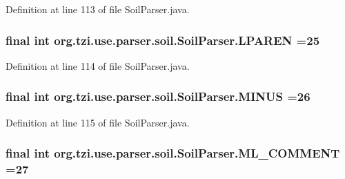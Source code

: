 Definition at line 113 of file Soil\-Parser.\-java.

\hypertarget{classorg_1_1tzi_1_1use_1_1parser_1_1soil_1_1_soil_parser_a947851c6c4b95fc941046367f0815c06}{
\subsubsection[{L\-P\-A\-R\-E\-N}]{\setlength{\rightskip}{0pt plus 5cm}final int org.\-tzi.\-use.\-parser.\-soil.\-Soil\-Parser.\-L\-P\-A\-R\-E\-N =25\hspace{0.3cm}{\ttfamily [static]}}}\label{classorg_1_1tzi_1_1use_1_1parser_1_1soil_1_1_soil_parser_a947851c6c4b95fc941046367f0815c06}


Definition at line 114 of file Soil\-Parser.\-java.

\hypertarget{classorg_1_1tzi_1_1use_1_1parser_1_1soil_1_1_soil_parser_a0a811be4aa395bd1800701c3e7b200cb}{
\subsubsection[{M\-I\-N\-U\-S}]{\setlength{\rightskip}{0pt plus 5cm}final int org.\-tzi.\-use.\-parser.\-soil.\-Soil\-Parser.\-M\-I\-N\-U\-S =26\hspace{0.3cm}{\ttfamily [static]}}}\label{classorg_1_1tzi_1_1use_1_1parser_1_1soil_1_1_soil_parser_a0a811be4aa395bd1800701c3e7b200cb}


Definition at line 115 of file Soil\-Parser.\-java.

\hypertarget{classorg_1_1tzi_1_1use_1_1parser_1_1soil_1_1_soil_parser_a061d5bac6b332f49da6c5c13ac23731b}{
\subsubsection[{M\-L\-\_\-\-C\-O\-M\-M\-E\-N\-T}]{\setlength{\rightskip}{0pt plus 5cm}final int org.\-tzi.\-use.\-parser.\-soil.\-Soil\-Parser.\-M\-L\-\_\-\-C\-O\-M\-M\-E\-N\-T =27\hspace{0.3cm}{\ttfamily [static]}}}\label{classorg_1_1tzi_1_1use_1_1parser_1_1soil_1_1_soil_parser_a061d5bac6b332f49da6c5c13ac23731b}


